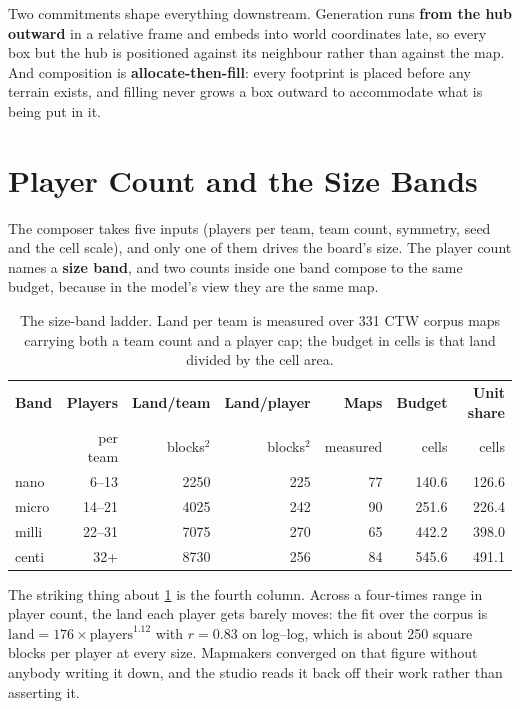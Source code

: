 Two commitments shape everything downstream. Generation runs \textbf{from the hub
outward} in a relative frame and embeds into world coordinates late, so every box
but the hub is positioned against its neighbour rather than against the map. And
composition is \textbf{allocate-then-fill}: every footprint is placed before any
terrain exists, and filling never grows a box outward to accommodate what is being
put in it.

\section{Player Count and the Size Bands}

The composer takes five inputs (players per team, team count, symmetry, seed and
the cell scale), and only one of them drives the board's size. The player
count names a \textbf{size band}, and two counts inside one band compose to the
same budget, because in the model's view they are the same map.

\begin{table}[htbp]
\caption{The size-band ladder. Land per team is measured over 331 CTW corpus maps
carrying both a team count and a player cap; the budget in cells is that land
divided by the cell area.}
\label{tab:bands}
\small
\begin{tabular}{l r r r r r r}
\toprule
\textbf{Band} & \textbf{Players} & \textbf{Land/team} & \textbf{Land/player} &
\textbf{Maps} & \textbf{Budget} & \textbf{Unit share} \\
 & per team & blocks$^2$ & blocks$^2$ & measured & cells & cells \\
\midrule
nano  & 6--13 & 2250 & 225 & 77 & 140.6 & 126.6 \\
micro & 14--21 & 4025 & 242 & 90 & 251.6 & 226.4 \\
milli & 22--31 & 7075 & 270 & 65 & 442.2 & 398.0 \\
centi & 32+ & 8730 & 256 & 84 & 545.6 & 491.1 \\
\bottomrule
\end{tabular}
\end{table}

The striking thing about \cref{tab:bands} is the fourth column. Across a
four-times range in player count, the land each player gets barely moves: the fit
over the corpus is $\text{land} = 176 \times \text{players}^{1.12}$ with
$r = 0.83$ on log--log, which is about 250 square blocks per player at every size.
Mapmakers converged on that figure without anybody writing it down, and the studio
reads it back off their work rather than asserting it.

